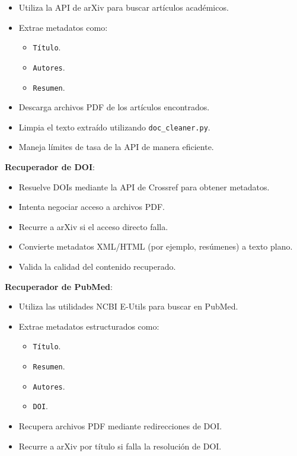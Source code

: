 \documentclass[12pt]{article}
\begin{document}
    \begin{itemize}
        \item Utiliza la API de arXiv para buscar artículos académicos.
        \item Extrae metadatos como:
            \begin{itemize}
                \item \texttt{Título}.
                \item \texttt{Autores}.
                \item \texttt{Resumen}.
            \end{itemize}
        \item Descarga archivos PDF de los artículos encontrados.
        \item Limpia el texto extraído utilizando \texttt{doc\_cleaner.py}.
        \item Maneja límites de tasa de la API de manera eficiente.
    \end{itemize}

    
\textbf{Recuperador de DOI}:

    \begin{itemize}
        \item Resuelve DOIs mediante la API de Crossref para obtener metadatos.
        \item Intenta negociar acceso a archivos PDF.
        \item Recurre a arXiv si el acceso directo falla.
        \item Convierte metadatos XML/HTML (por ejemplo, resúmenes) a texto plano.
        \item Valida la calidad del contenido recuperado.
    \end{itemize}

    
\textbf{Recuperador de PubMed}:
    \begin{itemize}
        \item Utiliza las utilidades NCBI E-Utils para buscar en PubMed.
        \item Extrae metadatos estructurados como:
            \begin{itemize}
                \item \texttt{Título}.
                \item \texttt{Resumen}.
                \item \texttt{Autores}.
                \item \texttt{DOI}.
            \end{itemize}
        \item Recupera archivos PDF mediante redirecciones de DOI.
        \item Recurre a arXiv por título si falla la resolución de DOI.
    \end{itemize}
\end{document}
